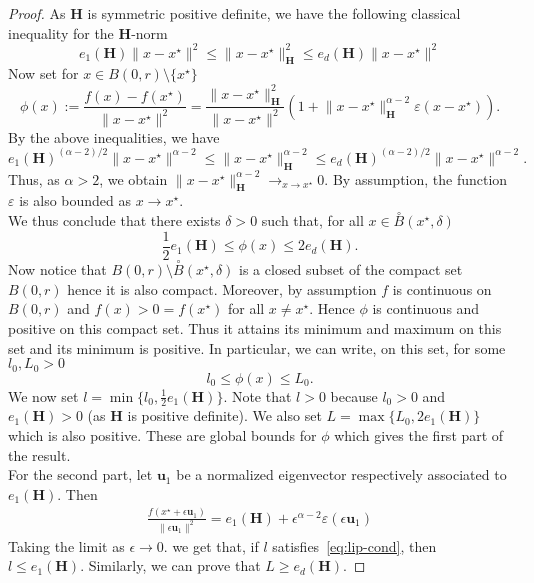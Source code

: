 \begin{proof}
As $\mathbf{H}$ is symmetric positive definite, we have the following
classical inequality for the $\mathbf{H}$-norm
\begin{equation}\label{eq:sym-mat-ineq}
e_{1}(\mathbf{H})\lVert x-x^{\star}\rVert^{2}\le\lVert x-x^{\star}\rVert_{\mathbf{H}}^{2}\le e_{d}(\mathbf{H})\lVert x-x^{\star}\rVert^{2}
\end{equation}
Now set for $x\in B(0,r)\setminus\{x^{\star}\}$
\[
\phi(x):=\frac{f(x)-f(x^{\star})}{\lVert x-x^{\star}\rVert^{2}}=\frac{\lVert x-x^{\star}\rVert_{\mathbf{H}}^{2}}{\lVert x-x^{\star}\rVert^{2}}(1+\lVert x-x^{\star}\rVert_{\mathbf{H}}^{\alpha-2}\varepsilon(x-x^{\star})).
\]
By the above inequalities, we have 
\[
e_{1}(\mathbf{H})^{(\alpha-2)/2}\lVert x-x^{\star}\rVert^{\alpha-2}\le\lVert x-x^{\star}\rVert_{\mathbf{H}}^{\alpha-2}\le e_{d}(\mathbf{H})^{(\alpha-2)/2}\lVert x-x^{\star}\rVert^{\alpha-2}.
\]
Thus, as $\alpha>2$, we obtain $\lVert x-x^{\star}\rVert_{\mathbf{H}}^{\alpha-2}\rightarrow_{x\rightarrow x^{\star}}0$.
By assumption, the function $\varepsilon$ is also bounded as $x\rightarrow x^{\star}$.
\\
We thus conclude that there exists $\delta>0$ such that, for all
$x\in\overset{\circ}{B}(x^{\star},\delta)$
\[
\frac{1}{2}e_{1}(\mathbf{H})\le\phi(x)\le2e_{d}(\mathbf{H}).
\]
Now notice that $B(0,r)\setminus\overset{\circ}{B}(x^{\star},\delta)$
is a closed subset of the compact set $B(0,r)$ hence it is also compact.
Moreover, by assumption $f$ is continuous on $B(0,r)$ and $f(x)>0=f(x^{\star})$
for all $x\neq x^{\star}.$ Hence $\phi$ is continuous and positive
on this compact set. Thus it attains its minimum and maximum on this
set and its minimum is positive. In particular, we can write, on this set, for
some $l_{0},L_{0}>0$
\[
l_{0}\le\phi(x)\le L_{0}.
\]
We now set $l=\min\{l_{0},\frac{1}{2}e_{1}(\mathbf{H})\}$. Note that
$l>0$ because $l_{0}>0$ and $e_{1}(\mathbf{H})>0$ (as $\mathbf{H}$
is positive definite). We also set $L=\max\{L_{0},2e_{1}(\mathbf{H})\}$
which is also positive. These are global bounds for $\phi$ which gives the first part of the result.\\
For the second part, let $\mathbf{u}_{1}$ be a normalized eigenvector
respectively associated to $e_{1}(\mathbf{H})$. Then 
\begin{align*}
\frac{f(x^{\star}+\epsilon\mathbf{u}_{1})}{\lVert\epsilon\mathbf{u}_{1}\rVert^{2}}=e_{1}(\mathbf{H})+\epsilon^{\alpha-2}\varepsilon(\epsilon\mathbf{u}_{1})
\end{align*}
Taking the limit as $\epsilon\to0$. we get that, if $l$ satisfies~\eqref{eq:lip-cond},
then $l\leq e_{1}(\mathbf{H})$. Similarly, we can prove that $L\geq e_{d}(\mathbf{H})$.\end{proof}
